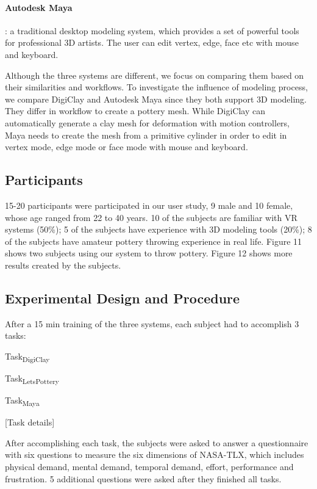 \paragraph{Autodesk Maya}: a traditional desktop modeling system, which provides a set of powerful tools for professional 3D artists. The user can edit vertex, edge, face etc with mouse and keyboard.

Although the three systems are different, we focus on comparing them based on their similarities and workflows.
To investigate the influence of modeling process, we compare DigiClay and Autodesk Maya since they both support 3D modeling. They differ in workflow to create a pottery mesh. While DigiClay can automatically generate a clay mesh for deformation with motion controllers, Maya needs to create the mesh from a primitive cylinder in order to edit in vertex mode, edge mode or face mode with mouse and keyboard. 


\subsection{Participants}
\label{sec:6.2}
15-20 participants were participated in our user study, 9 male and 10 female, whose age ranged from 22 to 40 years. 10 of the subjects are familiar with VR systems (50\%); 5 of the subjects have experience with 3D modeling tools (20\%); 8 of the subjects have amateur pottery throwing experience in real life.
Figure 11 shows two subjects using our system to throw pottery. Figure 12 shows more results created by the subjects.

\subsection{Experimental Design and Procedure}
\label{sec:6.3}

After a 15 min training of the three systems, each subject had to accomplish 3 tasks:

Task\textsubscript{DigiClay}

Task\textsubscript{LetsPottery}

Task\textsubscript{Maya}

[Task details]

After accomplishing each task, the subjects were asked to answer a questionnaire with six questions to measure the six dimensions of NASA-TLX, which includes physical demand, mental demand, temporal demand, effort, performance and frustration. 5 additional questions were asked after they finished all tasks.

